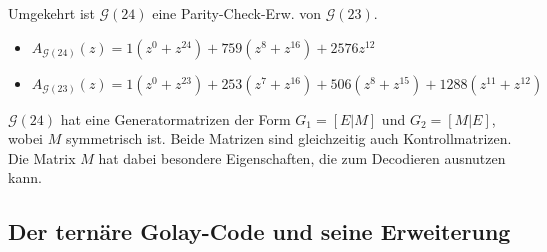 \documentclass{cheat-sheet}
\newcommand{\F}{\mathbb{F}} %
\DeclareMathOperator{\wt}{wt} %
\newcommand{\Golay}{\mathcal{G}} %
\begin{document}
\begin{bem}
  Umgekehrt ist $\Golay(24)$ eine Parity-Check-Erw. von $\Golay(23)$.
\end{bem}

\begin{satz}
  \begin{itemize}
    \item $A_{\Golay(24)}(z) = 1 (z^0 + z^{24}) + 759 (z^8 + z^{16}) + 2576 z^{12}$
    \item $A_{\Golay(23)}(z) = 1 (z^0 \!+\! z^{23}) + 253 (z^7 \!+\! z^{16}) + 506 (z^8 \!+\! z^{15}) + 1288 (z^{11} \!+\! z^{12})$
  \end{itemize}
\end{satz}

\begin{bem}
  $\Golay(24)$ hat eine Generatormatrizen der Form $G_1 = [E|M]$ und $G_2 = [M|E]$, wobei $M$ symmetrisch ist.
  Beide Matrizen sind gleichzeitig auch Kontrollmatrizen.
  Die Matrix $M$ hat dabei besondere Eigenschaften, die zum Decodieren ausnutzen kann.
\end{bem}

\iffalse
  Decodierung: Schreibe $x \in \F_2^{24}$ als $x_1 | x_2$ mit $x_1, x_2 \in \F_2^{12}$.
  Berechne Syndome $S_1 = G_1 y = G_1 e = e_1 + M e_2$ und $S_2 = G_2 y = M e_1 + e_2$.
  Es gilt:
  \begin{itemize}
    \item $\wt(S_1) \leq 3 \iff e_2 = 0 \implies S_1 = e_1 \implies e = e_1 | 0 = S_1 | 0$
    \item $\wt(S_2) \leq 3 \implies e_1 = 0 \implies S_2 = e_2 \implies e = 0 | S_2$
  \end{itemize}
  $\wt(S_1), \wt(S_2) \geq 4$.
  Berechne $S_i = G_2 \cdot (y + (\epsilon_i|0)) = m(e_1 + \epsilon_i) + e_2$
  Beachte: $(\wt(e_1), \wt(e_2)) \in \{ (1,2), (1,1), (2,1) \}$
  $\wt(e_1) = 2 \iff \wt(S_i) \geq 4$ für alle $i = 1, \ldots, 12$
  $\wt(e_1) = 1 \iff$ es gibt genau ein $l$ mit $\wt(s_l) \leq 2$ nämlich das $l$ wodurch $e_1 = \epsilon_l$
\fi


\subsection{Der ternäre Golay-Code und seine Erweiterung}
\end{document}
